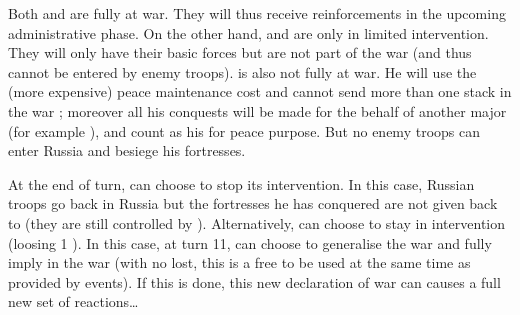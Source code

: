 \begin{exemple}
  Both \paysCrimee and \paysPalatinat are fully at war. They will thus receive
  reinforcements in the upcoming administrative phase. On the other hand,
  \paysKazan and \paysAstrakhan are only in limited intervention. They will
  only have their basic forces but are not part of the war (and thus cannot be
  entered by enemy troops). \RUS is also not fully at war. He will use the
  (more expensive) peace maintenance cost and cannot send more than one stack
  in the war ; moreover all his conquests will be made for the behalf of
  another major (for example \HIS), and count as his for peace purpose. But no
  enemy troops can enter Russia and besiege his fortresses.

  At the end of turn, \RUS can choose to stop its intervention. In this case,
  Russian troops go back in Russia but the fortresses he has conquered are not
  given back to \TUR (they are still controlled by \HIS). Alternatively, \RUS
  can choose to stay in intervention (loosing 1 \STAB). In this case, at turn
  11, \TUR can choose to generalise the war and fully imply \RUS in the war
  (with no \STAB lost, this is a free \CB to be used at the same time as \CB
  provided by events). If this is done, this new declaration of war can causes
  a full new set of reactions\ldots
\end{exemple}

